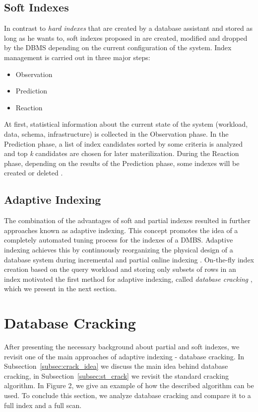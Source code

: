 \documentclass[10pt, conference, compsocconf]{IEEEtran}
\begin{document}
\subsection{Soft Indexes}
\label{subsec:soft}
In contrast to \emph{hard indexes} that are created by a database assistant and stored as long as he wants to, soft indexes proposed in \cite{soft_indexes} are created, modified and dropped by the DBMS depending on the current configuration of the system. Index management is carried out in three major steps:
\begin{itemize}
\item{Observation}
\item{Prediction}
\item{Reaction}
\end{itemize}

At first, statistical information about the current state of the system (workload, data, schema, infrastructure) is collected in the Observation phase. In the Prediction phase, a list of index candidates sorted by some criteria is analyzed and top \textit{k} candidates are chosen for later materilization. During the Reaction phase, depending on the results of the Prediction phase, some indexes will be created or deleted \cite{soft_indexes}.

\subsection{Adaptive Indexing}
The combination of the advantages of soft and partial indexes resulted in further approaches known as adaptive indexing. This concept promotes the idea of a completely automated tuning process for the indexes of a DMBS. Adaptive indexing achieves this by continuously reorganizing the physical design of a database system during incremental and partial online indexing \cite{defin}. On-the-fly index creation based on the query workload and storing only subsets of rows in an index motivated the first method for adaptive indexing, called \emph{database cracking} \cite{cracking}, which we present in the next section.

\section{Database Cracking}
\label{sec:cracking}
After presenting the necessary background about partial and soft indexes, we revisit one of the main approaches of adaptive indexing - database cracking. In Subsection~\ref{subsec:crack_idea} we discuss the main idea behind database cracking, in Subsection~\ref{subsec:st_crack} we revisit the standard cracking algorithm. In Figure 2, we give an example of how the described algorithm can be used. To conclude this section, we analyze database cracking and compare it to a full index and a full scan.
\end{document}
